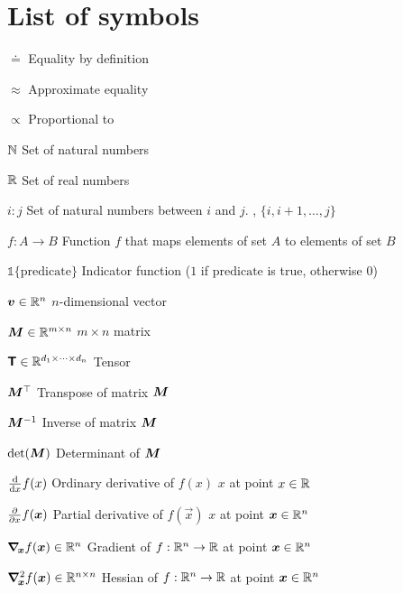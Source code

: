 \section*{List of symbols}

\vspace{10mm}

\begin{abbrv}
    \item[$\doteq$] Equality by definition
    \item[$\approx$] Approximate equality
    \item[$\propto$] Proportional to
    \item[$\N$] Set of natural numbers
    \item[$\R$] Set of real numbers
    \item[$i:j$] Set of natural numbers between $i$ and $j$. \Ie, $\{i, i+1,\ldots,j\}$
    \item[$f: A \to B$] Function $f$ that maps elements of set $A$ to elements of set $B$
    \item[$\mathbb{1}\{\mathrm{predicate}\}$] Indicator function ($1$ if $\mathrm{predicate}$ is true, otherwise $0$)

    \item

    \item[$\vec{v} \in \R^n$] $n$-dimensional vector
    \item[$\mat{M} \in \R^{m\times n}$] $m \times n$ matrix
    \item[$\tens{T} \in \R^{d_1 \times \cdots \times d_n}$] Tensor
    \item[$\transpose{\mat{M}}$] Transpose of matrix $\mat{M}$
    \item[$\inv{\mat{M}}$] Inverse of matrix $\mat{M}$
    \item[$\det{\mat{M}}$] Determinant of $\mat{M}$

    \item

    \item[$\odv*{f(x)}{x}$] Ordinary derivative of $f(x)$ \wrt $x$ at point $x\in\R$
    \item[$\pdv*{f(\vec{x})}{x}$] Partial derivative of $f(\vec{x})$ \wrt $x$ at point $\vec{x}\in\R^n$
    \item[$\grad{f(\vec{x})}{\vec{x}} \in \R^n$] Gradient of $f: \R^n \to \R$ at point $\vec{x}\in\R^n$
    \item[$\hess{f(\vec{x})}{\vec{x}} \in \R^{n\times n}$] Hessian of $f: \R^n \to \R$ at point $\vec{x}\in\R^n$


\end{abbrv}
